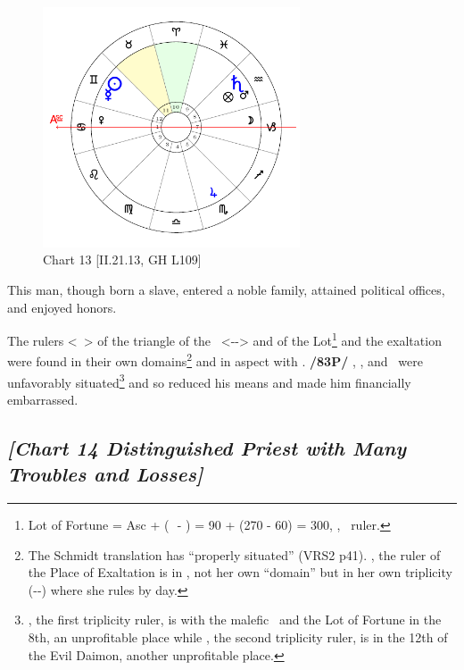 \clearpage
\begin{figure}
\centering
\vspace{-20pt}
\includegraphics[width=0.68\textwidth]{charts/2_21_13}
\caption{Chart 13 [II.21.13, GH L109]}
\label{fig:chart13}
\end{figure}

This man, though born a slave, entered a noble family, attained political offices, and enjoyed honors. 

The rulers <\Saturn\, \Mercury> of the triangle of the \Sun\, <\Gemini-\Libra-\Aquarius> and of the Lot\footnote{Lot of Fortune = Asc + (\Moon\,\, - \Sun) = 90 + (270 - 60) = 300, \Aquarius, \Saturn\, ruler.}
 and the exaltation were found in their own domains\footnote{The Schmidt translation has ``properly situated'' (VRS2 p41). \Venus, the ruler of the Place of Exaltation is in \Cancer, not her own ``domain'' but in her own triplicity (\Cancer-\Scorpio-\Pisces) where she rules by day.} and in aspect with \Jupiter. \textbf{/83P/} \Mars, \Saturn, and \Mercury\, were unfavorably situated\footnote{\Saturn, the first triplicity ruler, is with the malefic \Mars\, and the Lot of Fortune in the 8th, an unprofitable place while \Mercury, the second triplicity ruler, is in the 12th of the Evil Daimon, another unprofitable place.} and so reduced his means and made
him financially embarrassed.

\newpage
\subsection*{\textit{[Chart 14 Distinguished Priest with Many Troubles and Losses]}}

